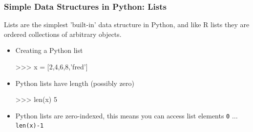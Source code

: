 \documentclass{beamer}
\begin{document}
\begin{frame}[fragile]
  \frametitle{Simple Data Structures in Python: Lists}

Lists are the simplest 'built-in' data structure in Python, and like R lists they
are ordered collections of arbitrary objects.

\begin{itemize}
	\item Creating a Python list
\begin{Pcode}	
>>> x = [2,4,6,8,'fred']
\end{Pcode}

	\item Python lists have length (possibly zero)
\begin{Pcode}	
>>> len(x)
5
\end{Pcode}

\item Python lists are zero-indexed, this means you can access list elements \texttt{0} $\ldots$ \texttt{len(x)-1}


\end{itemize}

\end{frame}
\end{document}
